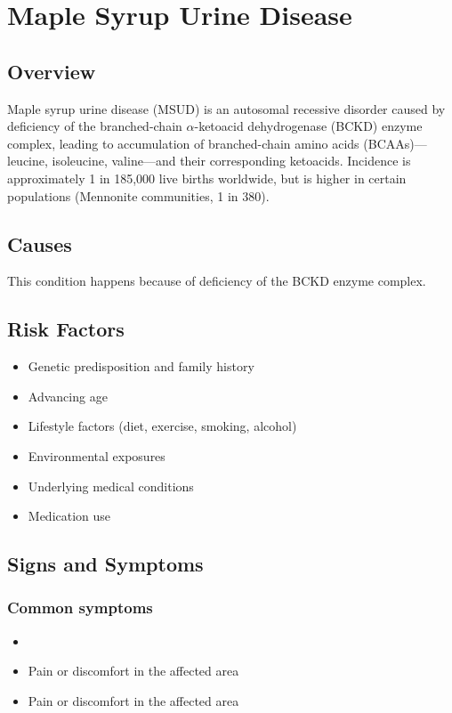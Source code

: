 \chapter{Maple Syrup Urine Disease}
\label{sec:Maple Syrup Urine Disease}

\section{Overview}
Maple syrup urine disease (MSUD) is an autosomal recessive disorder caused by deficiency of the branched-chain $\alpha$-ketoacid dehydrogenase (BCKD) enzyme complex, leading to accumulation of branched-chain amino acids (BCAAs)---leucine, isoleucine, valine---and their corresponding ketoacids. Incidence is approximately 1 in 185,000 live births worldwide, but is higher in certain populations (Mennonite communities, 1 in 380).
\section{Causes}
This condition happens because of deficiency of the BCKD enzyme complex.     
\section{Risk Factors}

\begin{itemize}[noitemsep]
  \item Genetic predisposition and family history
  \item Advancing age
  \item Lifestyle factors (diet, exercise, smoking, alcohol)
  \item Environmental exposures
  \item Underlying medical conditions
  \item Medication use
\end{itemize}
\section{Signs and Symptoms}

\subsection{Common symptoms}
\begin{itemize}[noitemsep]
  \item \item Pain or discomfort in the affected area    \item Pain or discomfort in the affected area
  \end{itemize}

